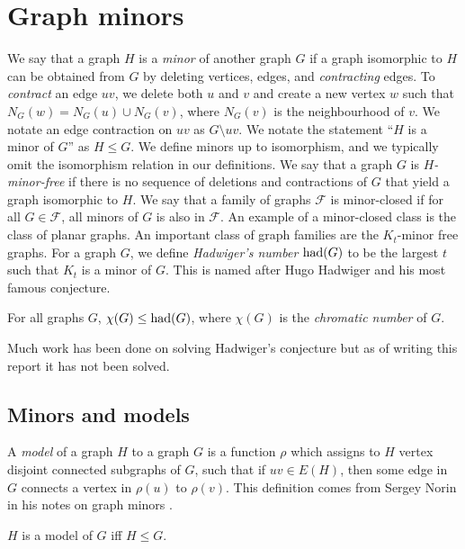 \section{Graph minors}\label{sec:Graph Minors}
We say that a graph \(H\) is a \textit{minor} of another graph \(G\) if a graph isomorphic to \(H\) can be obtained from \(G\) by deleting vertices, edges, and \textit{contracting} edges. To \textit{contract} an edge \(uv\), we delete both \(u\) and \(v\) and create a new vertex \(w\) such that \(N_G(w) = N_G(u) \cup N_G(v)\), where \(N_G(v)\) is the neighbourhood of \(v\). We notate an edge contraction on \(uv\) as \(G\setminus uv\).
We notate the statement ``\(H\) is a minor of \(G\)'' as \(H \leq G\). 
We define minors up to isomorphism, and we typically omit the isomorphism relation in our definitions. We say that a graph \(G\) is \textit{\(H\)-minor-free} if there is no sequence of deletions and contractions of \(G\) that yield a graph isomorphic to \(H\). We say that a family of graphs \(\mathcal{F}\) is minor-closed if for all \(G \in \mathcal{F}\), all minors of \(G\) is also in \(\mathcal{F}\). 
An example of a minor-closed class is the class of planar graphs. 
An important class of graph families are the \(K_t\)-minor free graphs. For a graph \(G\), we define \textit{Hadwiger's number} \(\operatorname{had}(G)\) to be the largest \(t\) such that \(K_t\) is a minor of \(G\). This is named after Hugo Hadwiger and his most famous conjecture.

\begin{conjecture}\cite{hadwigerUeberKlassifikationStreckenkomplexe1943}
	For all graphs \(G\), \(\chi(G) \leq \operatorname{had}(G)\), where \(\chi(G)\) is the \textit{chromatic number} of \(G\). 
\end{conjecture}
Much work has been done on solving Hadwiger's conjecture but as of writing this report it has not been solved. 
\subsection{Minors and models}
A \textit{model} of a graph \(H\) to a graph \(G\) is a function \(\rho\) which assigns to \(H\) vertex disjoint connected subgraphs of \(G\), such that if \(uv \in E(H)\), then some edge in \(G\) connects a vertex in \(\rho(u)\) to \(\rho(v)\). This definition comes from Sergey Norin in his notes on graph minors \cite{norinMath599GraphMinors2017}. 

\begin{theorem}
	\(H\) is a model of \(G\) iff \( H \leq G\). 
\end{theorem}


